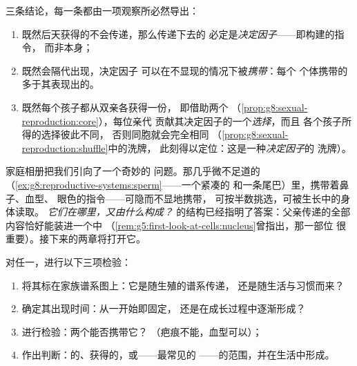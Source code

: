 \begin{proposition}[这些模式迫使我们得出的结论]\label{prop:g9:heredity-and-traits:conclusions}
三条结论，每一条都由一项观察所必然导出：
\begin{enumerate}
  \item 既然后天获得的不会传递，那么传递下去的
        必定是\emph{决定因子}——即构建的指令，
        而非本身；
  \item 既然会隔代出现，决定因子
        可以在不显现的情况下被\emph{携带}：每个
        个体携带的多于其表现出的。
  \item 既然每个孩子都从双亲各获得一份，
        即借助两个
        （\cref{prop:g8:sexual-reproduction:core}），每位亲代
        贡献其决定因子的一个\emph{选择}，而且
        各个孩子所得的选择彼此不同，
        否则同胞就会完全相同
        （\cref{prop:g8:sexual-reproduction:shuffle}中的洗牌，
        此刻得以定位：这是一种\emph{决定因子}的
        洗牌）。
\end{enumerate}
\end{proposition}
\admitted

\begin{remark}[这一问题的提出]\label{rem:g9:heredity-and-traits:question}
家庭相册把我们引向了一个奇妙的
问题。那几乎微不足道的
（\cref{ex:g8:reproductive-systems:sperm}——一个紧凑的
和一条尾巴）里，携带着鼻子、血型、
眼色的指令——可隐而不显地携带，
可按半数挑选，可被生长中的身体读取。
\emph{它们在哪里，又由什么构成？}
的结构已经指明了答案：父亲传递的全部
内容恰好能装进一个中
（\cref{rem:g5:first-look-at-cells:nucleus}曾指出，那一部位
很重要）。接下来的两章将打开它。
\end{remark}

\begin{method}[审查一个性状]\label{met:g9:heredity-and-traits:audit}
对任一，进行以下三项检验：
\begin{enumerate}
  \item 将其标在家族谱系图上：它是随生殖的谱系传递，
        还是随生活与习惯而来？
  \item 确定其出现时间：从一开始即固定，
        还是在成长过程中逐渐形成？
  \item 进行检验：两个能否携带它？
        （疤痕不能，血型可以）；
  \item 作出判断：的、获得的，或——最常见的
——的范围，并在生活中形成。
\end{enumerate}
\end{method}

